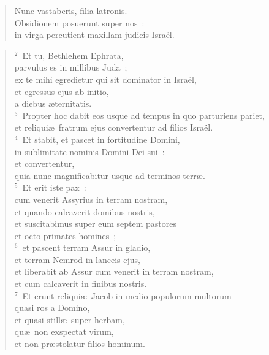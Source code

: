 \begin{flushleft}\begin{verse}\vspace{-19pt}Nunc vastaberis, filia latronis.\\ Obsidionem posuerunt super nos~:\\ in virga percutient maxillam judicis Isra\"el.\end{verse}\end{flushleft}


\begin{flushleft}\begin{verse}\vspace{6pt}${}^{2}$~Et tu, Bethlehem Ephrata,\\ parvulus es in millibus Juda~;\\ ex te mihi egredietur qui sit dominator in Isra\"el,\\ et egressus ejus ab initio,\\ a diebus \ae ternitatis.\\
${}^{3}$~Propter hoc dabit eos usque ad tempus in quo parturiens pariet,\\ et reliqui\ae\ fratrum ejus convertentur ad filios Isra\"el.\\
${}^{4}$~Et stabit, et pascet in fortitudine Domini,\\ in sublimitate nominis Domini Dei sui~:\\ et convertentur,\\ quia nunc magnificabitur usque ad terminos terr\ae .\\
${}^{5}$~Et erit iste pax~:\\ cum venerit Assyrius in terram nostram,\\ et quando calcaverit domibus nostris,\\ et suscitabimus super eum septem pastores\\ et octo primates homines~;\\
${}^{6}$~et pascent terram Assur in gladio,\\ et terram Nemrod in lanceis ejus,\\ et liberabit ab Assur cum venerit in terram nostram,\\ et cum calcaverit in finibus nostris.\\
${}^{7}$~Et erunt reliqui\ae\ Jacob in medio populorum multorum\\ quasi ros a Domino,\\ et quasi still\ae\ super herbam,\\ qu\ae\ non exspectat virum,\\ et non pr\ae stolatur filios hominum.\\

\end{verse}
\end{flushleft}
